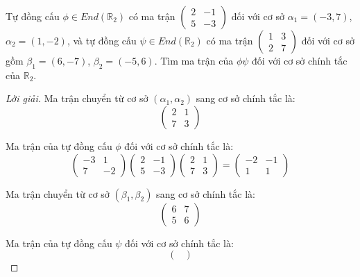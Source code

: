 \documentclass[class=linearalgebra,crop=false]{standalone}
\begin{document}
\begin{exercise}
    Tự đồng cấu $\phi\in End(\mathbb{R}_{2})$ có ma trận $\begin{pmatrix} 2 & -1 \\ 5 & -3 \end{pmatrix}$ đối với cơ sở $\alpha_{1} = (-3, 7)$, $\alpha_{2} = (1, -2)$, và tự đồng cấu $\psi\in End(\mathbb{R}_{2})$ có ma trận $\begin{pmatrix} 1 & 3 \\ 2 & 7 \end{pmatrix}$ đối với cơ sở gồm $\beta_{1} = (6, -7)$, $\beta_{2} = (-5, 6)$. Tìm ma trận của $\phi\psi$ đối với cơ sở chính tắc của $\mathbb{R}_{2}$.
\end{exercise}

\begin{proof}[Lời giải]
    Ma trận chuyển từ cơ sở $(\alpha_{1}, \alpha_{2})$ sang cơ sở chính tắc là:
    \[
        \begin{pmatrix}
            2 & 1 \\
            7 & 3
        \end{pmatrix}
    \]
    \par Ma trận của tự đồng cấu $\phi$ đối với cơ sở chính tắc là:
    \[
        \begin{pmatrix}
            -3 & 1 \\
            7  & -2
        \end{pmatrix}
        \begin{pmatrix}
            2 & -1 \\
            5 & -3
        \end{pmatrix}
        \begin{pmatrix}
            2 & 1 \\
            7 & 3
        \end{pmatrix}=
        \begin{pmatrix}
            -2 & -1 \\
            1  & 1
        \end{pmatrix}
    \]
    \par Ma trận chuyển từ cơ sở $(\beta_{1}, \beta_{2})$ sang cơ sở chính tắc là:
    \[
        \begin{pmatrix}
            6 & 7 \\
            5 & 6
        \end{pmatrix}
    \]
    \par Ma trận của tự đồng cấu $\psi$ đối với cơ sở chính tắc là:
    \[
        \begin{pmatrix}

\end{pmatrix}\]
\end{proof}
\end{document}
